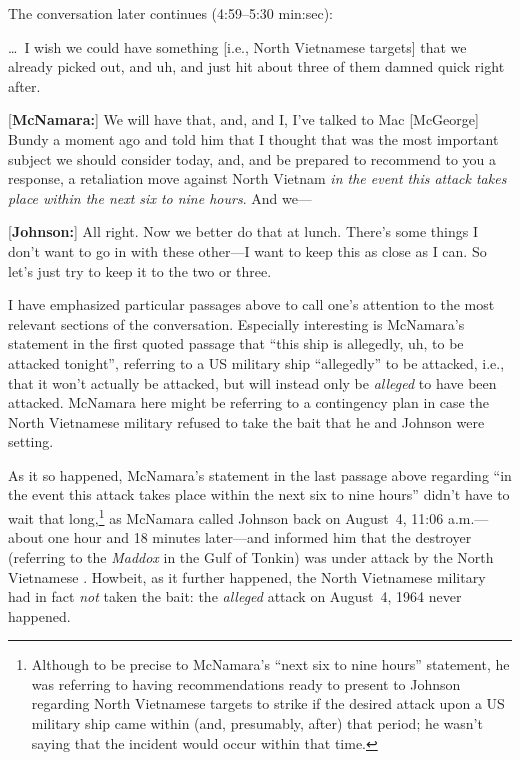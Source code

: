 \documentclass[letterpaper,12pt]{article}
\newenvironment{squotation}
  {\small\quotation}
  {\endquotation\normalsize}
\begin{document}
The conversation later continues (4:59--5:30 min:sec):

\begin{squotation}
[\textbf{Johnson:}] \dots~I wish we could have something [i.e., North Vietnamese targets] that we already picked out, and uh, and just hit about three of them damned quick right after.

[\textbf{McNamara:}] We will have that, and, and I, I've talked to Mac [McGeorge] Bundy a moment ago and told him that I thought that was the most important subject we should consider today, and, and be prepared to recommend to you a response, a retaliation move against North Vietnam \emph{in the event this attack takes place within the next six to nine hours}. And we---

[\textbf{Johnson:}] All right. Now we better do that at lunch. There's some things I don't want to go in with these other---I want to keep this as close as I can. So let's just try to keep it to the two or three.
\end{squotation}

I have emphasized particular passages above to call one's attention to the most relevant sections of the conversation. Especially interesting is McNamara's statement in the first quoted passage that ``this ship is allegedly, uh, to be attacked tonight'', referring to a US military ship ``allegedly'' to be attacked, i.e., that it won't actually be attacked, but will instead only be \emph{alleged} to have been attacked. McNamara here might be referring to a contingency plan in case the North Vietnamese military refused to take the bait that he and Johnson were setting.

As it so happened, McNamara's statement in the last passage above regarding ``in the event this attack takes place within the next six to nine hours'' didn't have to wait that long,\footnote{Although to be precise to McNamara's ``next six to nine hours'' statement, he was referring to having recommendations ready to present to Johnson regarding North Vietnamese targets to strike if the desired attack upon a US military ship came within (and, presumably, after) that period; he wasn't saying that the incident would occur within that time.} as McNamara called Johnson back on August~4, 11:06 a.m.---about one hour and 18 minutes later---and informed him that the destroyer (referring to the \emph{Maddox} in the Gulf of Tonkin) was under attack by the North Vietnamese \cite{JohnsonMcNamara1964-08-04am11-06}. Howbeit, as it further happened, the North Vietnamese military had in fact \emph{not} taken the bait: the \emph{alleged} attack on August~4, 1964 never happened.
\end{document}
